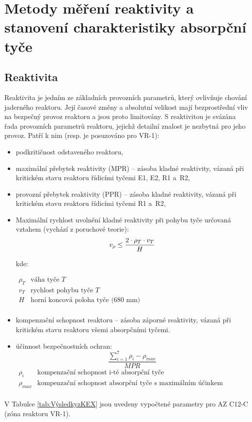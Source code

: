 \section[Měření reaktivity]{Metody měření reaktivity a stanovení charakteristiky absorpční tyče}

\subsection{Reaktivita}

Reaktivita je jedním ze základních provozních parametrů, který ovlivňuje chování jaderného reaktoru. Její časové změny a absolutní velikost mají bezprostřední vliv na bezpečný provoz reaktoru a jsou proto limitovány. S reaktivitou je svázána řada provozních parametrů reaktoru, jejichž detailní znalost je nezbytná pro jeho provoz. Patří k nim (resp. je posuzováno pro VR-1):

\begin{itemize}%
    \item podkritičnost odstaveného reaktoru,
    \item maximální přebytek reaktivity (MPR) -- zásoba kladné reaktivity, vázaná při kritickém stavu reaktoru řídicími tyčemi E1, E2, R1 a~R2,
    \item provozní přebytek reaktivity (PPR) -- zásoba kladné reaktivity, vázaná při kritickém stavu reaktoru řídicími tyčemi R1 a~R2,
    \item Maximální rychlost uvolnění kladné reaktivity při pohybu tyče určovaná vztahem (vychází z poruchové teorie): 
    \begin{equation} \label{eq:rychlost_reak-vyp}
v_\rho \leq {{2 \cdot \rho_T \cdot v_T} \over {H}}
\end{equation}

\noindent kde:

$
\begin{array} {ll}
\rho_T &  \text{váha tyče } T \\
v_T &  \text{rychlost pohybu tyče } T \\
H & \text{horní koncová poloha tyče (680 mm)} \\
\end{array}
$
    \item kompenzační schopnost reaktoru -- zásoba záporné reaktivity, vázaná při kritickém stavu reaktoru všemi absorpčními tyčemi.
    \item účinnost bezpečnostních ochran: \begin{equation} \label{eq:UBO}
\frac{\sum\limits_{i=1}^{7}\rho_i - \rho_{max}}{MPR}
\end{equation}
$
\begin{array} {ll}
\rho_i &  \text{kompenzační schopnost i-té absorpční tyče} \\
\rho_{max} & \text{kompenzační schopnost absorpční tyče s~maximálním účinkem} \\
\end{array}
$
\end{itemize}
V Tabulce \ref{tab:VýsledkyzKEX} jsou uvedeny vypočtené parametry pro AZ C12-C (zóna reaktoru VR-1). 

